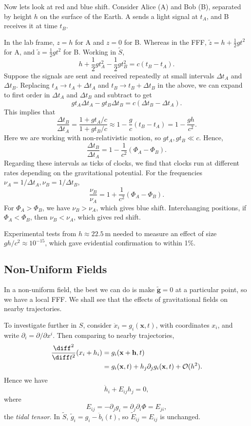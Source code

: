 \documentclass[12pt]{article}
\begin{document}
\begin{exbox}
Now lets look at red and blue shift. Consider Alice (A) and Bob (B), separated by height $h$ on the surface of the Earth. A sends a light signal at $t_A$, and B receives it at time $t_B$.

In the lab frame, $z = h$ for A and $z = 0$ for B. Whereas in the FFF, $\tilde z = h + \frac{1}{2} gt^2$ for A, and $\tilde z = \frac{1}{2}gt^2$ for B. Working in $\tilde S$,
\[
h + \frac{1}{2}gt_A^2 - \frac{1}{2}gt_B^2 = c(t_B - t_A).
\]
Suppose the signals are sent and received repeatedly at small intervals $\Delta t_A$ and $\Delta t_B$. Replacing $t_A \to t_A + \Delta t_A$ and $t_B \to t_B + \Delta t_B$ in the above, we can expand to first order in $\Delta t_A$ and $\Delta t_B$ and subtract to get
\[
g t_A \Delta t_A - g t_B \Delta t_B = c(\Delta t_B - \Delta t_A).
\]
This implies that
\[
\frac{\Delta t_B}{\Delta t_A} = \frac{1 + g t_A/c}{1 + g t_B/c} \approx 1 - \frac{g}{c} (t_B - t_A) = 1 - \frac{gh}{c^2}.
\]
Here we are working with non-relativistic motion, so $gt_A, gt_B \ll c$. Hence,
\[
\frac{\Delta t_B}{\Delta t_A} = 1 - \frac{1}{c^2}(\Phi_A - \Phi_B).
\]
Regarding these intervals as ticks of clocks, we find that clocks run at different rates depending on the gravitational potential. For the frequencies $\nu_A = 1/\Delta t_A, \nu_B = 1/\Delta t_B$,
\[
\frac{\nu_B}{\nu_A} = 1 + \frac{1}{c^2}(\Phi_A - \Phi_B).
\]
For $\Phi_A > \Phi_B$, we have $\nu_B > \nu_A$, which gives blue shift. Interchanging positions, if $\Phi_A < \Phi_B$, then $\nu_B < \nu_A$, which gives red shift.

Experimental tests from $h \approx \qty{22.5}{\metre}$ needed to measure an effect of size $gh/c^2 \approx 10^{-15}$, which gave evidential confirmation to within  1\%.
\end{exbox}

\subsection{Non-Uniform Fields}
\label{sub:non_un_f}

In a non-uniform field, the best we can do is make $\mathbf{\tilde g} = 0$ at a particular point, so we have a local FFF. We shall see that the effects of gravitational fields on nearby trajectories.

To investigate further in $S$, consider $\ddot x_i = g_i(\mathbf{x}, t)$, with coordinates $x_i$, and write $\partial_i = \partial/\partial x^i$. Then comparing to nearby trajectories,
\begin{align*}
	\frac{\diff^2}{\diff t^2}(x_i + h_i) &= g_i(\mathbf{x} + \mathbf{h}, t) \\
					     &= g_i(\mathbf{x}, t) + h_j \partial_j g_i(\mathbf{x}, t) + \mathcal{O}(h^2).
\end{align*}
Hence we have
\[
\ddot h_i + E_{ij} h_j = 0,
\]
where
\[
E_{ij} = - \partial_j g_i = \partial_j \partial_i \Phi = E_{ji},
\]
the \emph{tidal tensor}. In $\tilde S$, $\tilde g_i = g_i - \ddot b_i(t)$, so $\tilde E_{ij} = E_{ij}$ is unchanged.
\end{document}
